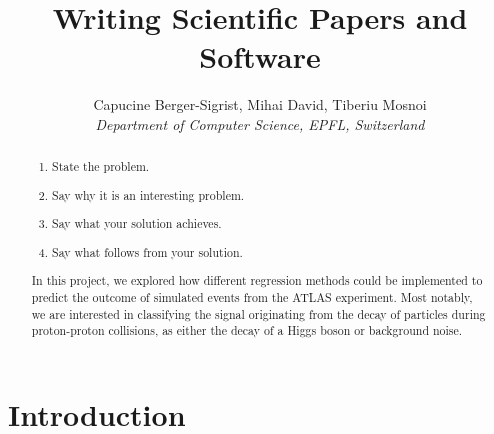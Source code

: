 \documentclass[10pt,conference,compsocconf]{IEEEtran}
\begin{document}
\title{Writing Scientific Papers and Software}

\author{
  Capucine Berger-Sigrist, Mihai David, Tiberiu Mosnoi\\
  \textit{Department of Computer Science, EPFL, Switzerland}
}

\maketitle
\begin{abstract}
\begin{enumerate}
    \item State the problem.
    \item Say why it is an interesting problem.
    \item Say what your solution achieves.
    \item Say what follows from your solution.
\end{enumerate}

In this project, we explored how different regression methods could 
be implemented to predict the outcome of simulated events from the ATLAS 
experiment. Most notably, we are interested in classifying the signal 
originating from the decay of particles during proton-proton collisions, 
as either the decay of a Higgs boson or background noise.
\end{abstract}

\section{Introduction}

\end{document}
